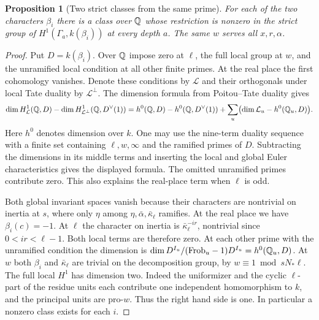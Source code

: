\documentclass[a4paper,11pt]{article}
\newtheorem{proposition}{Proposition}[section]
\theoremstyle{definition}
\theoremstyle{remark}
\numberwithin{equation}{section}
\begin{document}
\begin{proposition}[Two strict classes from the same prime]
\label{prop:strictclasses365}
For each of the two characters \(\beta_i\) there is a class over
\(\mathbb Q\) whose restriction is nonzero in the strict group
of \(H^1(\Gamma_a,k(\beta_i))\) at every depth \(a\).
The same \(w\) serves all \(x,r,\alpha\).
\end{proposition}
\begin{proof}
Put \(D=k(\beta_i)\). Over \(\mathbb Q\) impose zero at \(\ell\),
the full local group at \(w\), and the unramified local
condition at all other finite primes. At the real place the
first cohomology vanishes. Denote these conditions by
\(\mathcal L\) and their orthogonals under local Tate duality by
\(\mathcal L^\perp\). The dimension formula from Poitou--Tate
duality gives
\[
 \dim H^1_{\mathcal L}(\mathbb Q,D)
 -\dim H^1_{\mathcal L^\perp}(\mathbb Q,D^\vee(1))
 =h^0(\mathbb Q,D)-h^0(\mathbb Q,D^\vee(1))
    +\sum_u\bigl(\dim\mathcal L_u-h^0(\mathbb Q_u,D)\bigr).
\]
Here \(h^0\) denotes dimension over \(k\). One may use the
nine-term duality sequence with a finite set containing
\(\ell,w,\infty\) and the ramified primes of \(D\). Subtracting
the dimensions in its middle terms and inserting the local
and global Euler characteristics gives the displayed formula.
The omitted unramified primes contribute zero. This also
explains the real-place term when \(\ell\) is odd.~\cite{VII-V-V-milne98}

Both global invariant spaces vanish because their characters
are nontrivial on inertia at \(s\), where only \(\eta\) among
\(\eta,\bar\alpha,\bar\kappa_\ell\) ramifies. At the real place
we have \(\beta_i(c)=-1\). At \(\ell\) the character on inertia
is \(\bar\kappa_\ell^{-ir}\), nontrivial since \(0<ir<\ell-1\).
Both local terms are therefore zero. At each other prime with
the unramified condition the dimension is
\(\dim D^{I_u}/(\mathrm{Frob}_u-1)D^{I_u}=h^0(\mathbb Q_u,D)\).
At \(w\) both \(\beta_i\) and \(\bar\kappa_\ell\) are trivial
on the decomposition group, by \(w\equiv1\bmod sN_*\ell\).
The full local \(H^1\) has dimension two. Indeed the
uniformizer and the cyclic \(\ell\)-part of the residue units
each contribute one independent homomorphism to \(k\), and
the principal units are pro-\(w\). Thus the right hand side is
one. In particular a nonzero class exists for each \(i\).


\end{proof}
\end{document}
